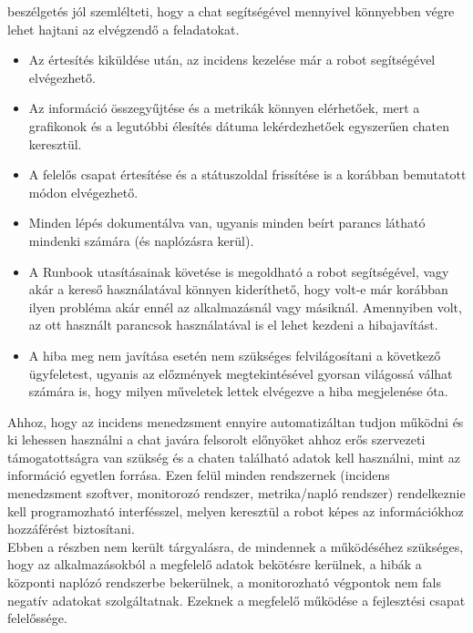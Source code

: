 beszélgetés jól szemlélteti, hogy a chat segítségével mennyivel könnyebben végre lehet hajtani az elvégzendő a feladatokat.\\
\begin{itemize}
  \item Az értesítés kiküldése után, az incidens kezelése már a robot segítségével elvégezhető.
  \item Az információ összegyűjtése és a metrikák könnyen elérhetőek, mert a grafikonok és a legutóbbi élesítés dátuma lekérdezhetőek egyszerűen chaten keresztül.
  \item A felelős csapat értesítése és a státuszoldal frissítése is a korábban bemutatott módon elvégezhető.
  \item Minden lépés dokumentálva van, ugyanis minden beírt parancs látható mindenki számára (és naplózásra kerül).
  \item A Runbook utasításainak követése is megoldható a robot segítségével, vagy akár a kereső használatával könnyen kideríthető, hogy volt-e már korábban ilyen probléma akár ennél az alkalmazásnál vagy másiknál. Amennyiben volt, az ott használt parancsok használatával is el lehet kezdeni a hibajavítást.
  \item A hiba meg nem javítása esetén nem szükséges felvilágosítani a következő ügyfeletest, ugyanis az előzmények megtekintésével gyorsan világossá válhat számára is, hogy milyen műveletek lettek elvégezve a hiba megjelenése óta.
\end{itemize}

Ahhoz, hogy az incidens menedzsment ennyire automatizáltan tudjon működni és ki lehessen használni a chat javára felsorolt előnyöket ahhoz erős szervezeti támogatottságra van szükség és a chaten található adatok kell használni, mint az információ egyetlen forrása. Ezen felül minden rendszernek (incidens menedzsment szoftver, monitorozó rendszer, metrika/napló rendszer) rendelkeznie kell programozható interfésszel, melyen keresztül a robot képes az információkhoz hozzáférést biztosítani.\\
Ebben a részben nem került tárgyalásra, de mindennek a működéséhez szükséges, hogy az alkalmazásokból a megfelelő adatok bekötésre kerülnek, a hibák a központi naplózó rendszerbe bekerülnek, a monitorozható végpontok nem fals negatív adatokat szolgáltatnak. Ezeknek a megfelelő működése a fejlesztési csapat felelőssége.